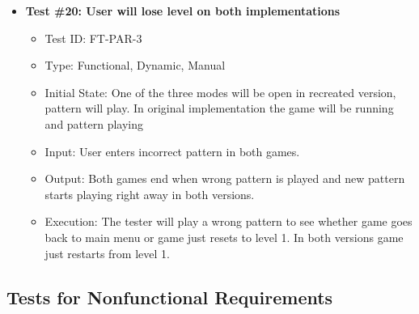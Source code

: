 \documentclass[12pt, titlepage]{article}
\begin{document}
\begin{itemize}
\item \textbf{Test \#20: User will lose level on both implementations }
\begin{itemize}
\item Test ID: FT-PAR-3
\item Type: Functional, Dynamic, Manual 		
\item Initial State: One of the three modes will be open in recreated version, pattern will play. In original implementation the game will be running and pattern playing				
\item Input: User enters incorrect pattern in both games.
\item Output: Both games end when wrong pattern is played and new pattern starts playing right away in both versions.			
\item Execution: The tester will play a wrong pattern to see whether game goes back to main menu or game just resets to level 1. In both versions game just restarts from level 1.
\end{itemize}

\end{itemize}

\subsection{Tests for Nonfunctional Requirements}
\end{document}
